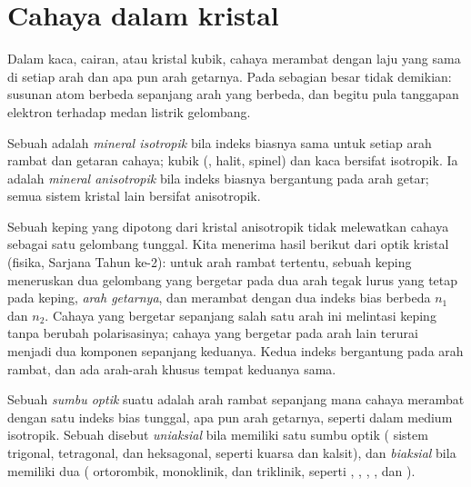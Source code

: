 \section{Cahaya dalam kristal}

Dalam kaca, cairan, atau kristal kubik, cahaya merambat dengan laju yang sama di setiap arah dan apa pun arah getarnya. Pada sebagian besar  tidak demikian: susunan atom berbeda sepanjang arah yang berbeda, dan begitu pula tanggapan elektron terhadap medan listrik gelombang.

\begin{definition}\label{def:b1:optical-mineralogy:anisotropic}
Sebuah  adalah \emph{mineral isotropik} bila indeks biasnya sama untuk setiap arah rambat dan getaran cahaya;  kubik (, halit, spinel) dan kaca bersifat isotropik. Ia adalah \emph{mineral anisotropik} bila indeks biasnya bergantung pada arah getar; semua  sistem kristal lain bersifat anisotropik.
\end{definition}

Sebuah keping yang dipotong dari kristal anisotropik tidak melewatkan cahaya sebagai satu gelombang tunggal. Kita menerima hasil berikut dari optik kristal (fisika, Sarjana Tahun ke-2): untuk arah rambat tertentu, sebuah keping  meneruskan dua gelombang yang bergetar pada dua arah tegak lurus yang tetap pada keping, \emph{arah getarnya}, dan merambat dengan dua indeks bias berbeda $n_1$ dan $n_2$. Cahaya yang bergetar sepanjang salah satu arah ini melintasi keping tanpa berubah polarisasinya; cahaya yang bergetar pada arah lain terurai menjadi dua komponen sepanjang keduanya. Kedua indeks bergantung pada arah rambat, dan ada arah-arah khusus tempat keduanya sama.

\begin{definition}\label{def:b1:optical-mineralogy:optic-axis}
Sebuah \emph{sumbu optik} suatu  adalah arah rambat sepanjang mana cahaya merambat dengan satu indeks bias tunggal, apa pun arah getarnya, seperti dalam medium isotropik. Sebuah  disebut \emph{uniaksial} bila memiliki satu sumbu optik ( sistem trigonal, tetragonal, dan heksagonal, seperti kuarsa dan kalsit), dan \emph{biaksial} bila memiliki dua ( ortorombik, monoklinik, dan triklinik, seperti , , , , dan ).
\end{definition}

